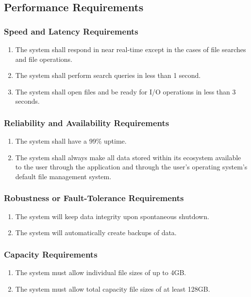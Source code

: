 \documentclass{article}
\begin{document}
\subsection{Performance Requirements}
\subsubsection{Speed and Latency Requirements}
\begin{enumerate}[SLR1]
    \item The system shall respond in near real-time except in the cases of file searches and file operations.
    \item The system shall perform search queries in less than 1 second.
    \item The system shall open files and be ready for I/O operations in less than 3 seconds.
\end{enumerate}

\subsubsection{Reliability and Availability Requirements}
\begin{enumerate}[R{A}R1]
    \item The system shall have a 99\% uptime.
    \item The system shall always make all data stored within its ecosystem available to the user through the application and through the user's operating system's default file management system.
\end{enumerate}

\subsubsection{Robustness or Fault-Tolerance Requirements}
\begin{enumerate}[RFR1]
    \item The system will keep data integrity upon spontaneous shutdown.
    \item The system will automatically create backups of data.
\end{enumerate}

\subsubsection{Capacity Requirements}
\begin{enumerate}[CR1]
    \item The system must allow individual file sizes of up to 4GB.
    \item The system must allow total capacity file sizes of at least 128GB.
\end{enumerate}
\end{document}
